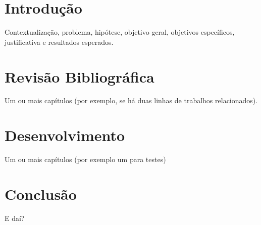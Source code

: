\documentclass[12pt, %
openright, 
oneside, %
a4paper,    %
brazil]{facom-ufu-abntex2}
\begin{document}

\tableofcontents*
\cleardoublepage





\textual



\chapter[Introdução]{Introdução}
Contextualização, problema, hipótese, objetivo geral, objetivos específicos, justificativa e resultados esperados.

\chapter{Revisão Bibliográfica}
Um ou mais capítulos (por exemplo, se há duas linhas de trabalhos relacionados).



\chapter{Desenvolvimento}
Um ou mais capítulos (por exemplo um para testes)



\chapter[Conclusão]{Conclusão}
E daí?





\postextual
\end{document}
